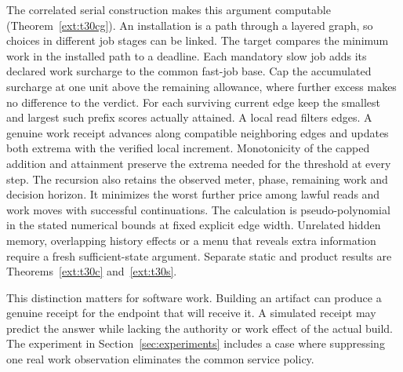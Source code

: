 The correlated serial construction makes this argument computable (Theorem~\ref{ext:t30cg}). An installation is a path through a layered graph, so choices in different job stages can be linked. The target compares the minimum work in the installed path to a deadline. Each mandatory slow job adds its declared work surcharge to the common fast-job base. Cap the accumulated surcharge at one unit above the remaining allowance, where further excess makes no difference to the verdict. For each surviving current edge keep the smallest and largest such prefix scores actually attained. A local read filters edges. A genuine work receipt advances along compatible neighboring edges and updates both extrema with the verified local increment. Monotonicity of the capped addition and attainment preserve the extrema needed for the threshold at every step. The recursion also retains the observed meter, phase, remaining work and decision horizon. It minimizes the worst further price among lawful reads and work moves with successful continuations. The calculation is pseudo-polynomial in the stated numerical bounds at fixed explicit edge width. Unrelated hidden memory, overlapping history effects or a menu that reveals extra information require a fresh sufficient-state argument. Separate static and product results are Theorems~\ref{ext:t30c} and~\ref{ext:t30s}.

This distinction matters for software work. Building an artifact can produce a genuine receipt for the endpoint that will receive it. A simulated receipt may predict the answer while lacking the authority or work effect of the actual build. The experiment in Section~\ref{sec:experiments} includes a case where suppressing one real work observation eliminates the common service policy.
